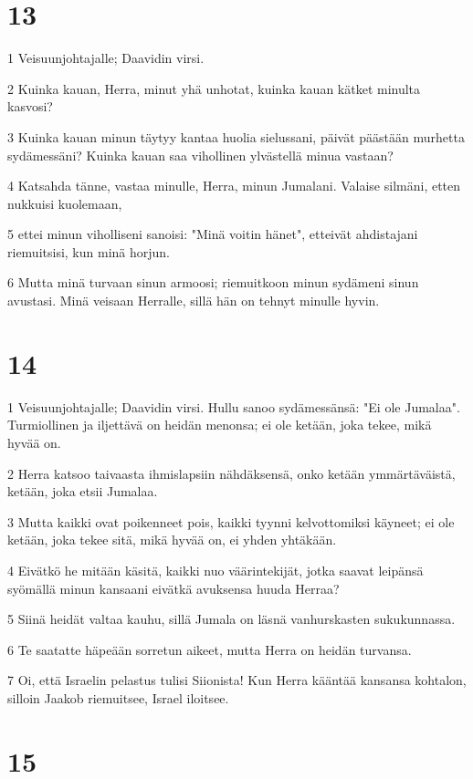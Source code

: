 \chapter{13}

\par 1 Veisuunjohtajalle; Daavidin virsi.
\par 2 Kuinka kauan, Herra, minut yhä unhotat, kuinka kauan kätket minulta kasvosi?
\par 3 Kuinka kauan minun täytyy kantaa huolia sielussani, päivät päästään murhetta sydämessäni? Kuinka kauan saa vihollinen ylvästellä minua vastaan?
\par 4 Katsahda tänne, vastaa minulle, Herra, minun Jumalani. Valaise silmäni, etten nukkuisi kuolemaan,
\par 5 ettei minun viholliseni sanoisi: "Minä voitin hänet", etteivät ahdistajani riemuitsisi, kun minä horjun.
\par 6 Mutta minä turvaan sinun armoosi; riemuitkoon minun sydämeni sinun avustasi. Minä veisaan Herralle, sillä hän on tehnyt minulle hyvin.

\chapter{14}

\par 1 Veisuunjohtajalle; Daavidin virsi. Hullu sanoo sydämessänsä: "Ei ole Jumalaa". Turmiollinen ja iljettävä on heidän menonsa; ei ole ketään, joka tekee, mikä hyvää on.
\par 2 Herra katsoo taivaasta ihmislapsiin nähdäksensä, onko ketään ymmärtäväistä, ketään, joka etsii Jumalaa.
\par 3 Mutta kaikki ovat poikenneet pois, kaikki tyynni kelvottomiksi käyneet; ei ole ketään, joka tekee sitä, mikä hyvää on, ei yhden yhtäkään.
\par 4 Eivätkö he mitään käsitä, kaikki nuo väärintekijät, jotka saavat leipänsä syömällä minun kansaani eivätkä avuksensa huuda Herraa?
\par 5 Siinä heidät valtaa kauhu, sillä Jumala on läsnä vanhurskasten sukukunnassa.
\par 6 Te saatatte häpeään sorretun aikeet, mutta Herra on heidän turvansa.
\par 7 Oi, että Israelin pelastus tulisi Siionista! Kun Herra kääntää kansansa kohtalon, silloin Jaakob riemuitsee, Israel iloitsee.

\chapter{15}

